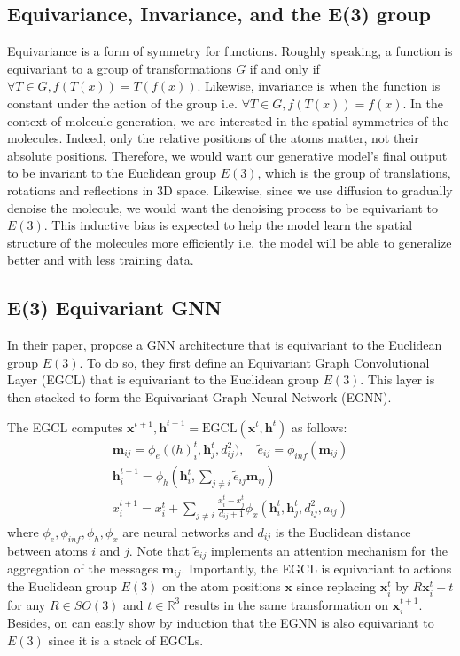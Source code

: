 \documentclass[sigconf]{acmart}
\begin{document}
\subsection{Equivariance, Invariance, and the E(3) group}
Equivariance is a form of symmetry for functions. Roughly speaking, a function is equivariant to a group of transformations $G$ 
if and only if $\forall T\in G, f(T(x)) = T(f(x))$.
Likewise, invariance is when the function is constant under the action of the group i.e. $\forall T\in G, f(T(x)) = f(x)$.
In the context of molecule generation, we are interested in the spatial symmetries of the molecules. Indeed, only the relative positions of the atoms matter, not their absolute positions.
Therefore, we would want our generative model's final output to be invariant to the Euclidean group $E(3)$, which is the group of translations, rotations and reflections in 3D space.
Likewise, since we use diffusion to gradually denoise the molecule, we would want the denoising process to be equivariant to $E(3)$.
This inductive bias is expected to help the model learn the spatial structure of the molecules more efficiently i.e. the model will be able to generalize better and with less training data.

\subsection{E(3) Equivariant GNN}
In their paper, \cite{edm} propose a GNN architecture that is equivariant to the Euclidean group $E(3)$. To do so, they first define an Equivariant 
Graph Convolutional Layer (EGCL) that is equivariant to the Euclidean group $E(3)$. This layer is then stacked to form the Equivariant Graph Neural Network (EGNN).

The EGCL computes $\mathbf{x}^{t+1}, \mathbf{h}^{t+1} = \text{EGCL}(\mathbf{x}^t, \mathbf{h}^t)$ as follows:
\begin{gather}
    \mathbf{m}_{ij} = \phi_e(\mathbf(h)_i^t, \mathbf{h}_j^t, d_{ij}^2), \quad \tilde{e}_{ij} = \phi_{inf}(\mathbf{m}_{ij}) \\
    \mathbf{h}_i^{t+1} = \phi_h(\mathbf{h}_i^t, \sum_{j\neq i} \tilde{e}_{ij} \mathbf{m}_{ij}) \\
    x_i^{t+1} = x_i^t + \sum_{j\neq i} \frac{x_i^t - x_j^t}{d_{ij}+1} \phi_x(\mathbf{h}_i^t, \mathbf{h}_j^t, d_{ij}^2, a_{ij})
\end{gather}
where $\phi_e, \phi_{inf}, \phi_h, \phi_x$ are neural networks and $d_{ij}$ is the Euclidean distance between atoms $i$ and $j$.
Note that $\tilde{e}_{ij}$ implements an attention mechanism for the aggregation of the messages $\mathbf{m}_{ij}$.
Importantly, the EGCL is equivariant to actions the Euclidean group $E(3)$ on the atom positions $\mathbf{x}$ since replacing $\mathbf{x}_i^t$ by $R\mathbf{x}_i^t + t$ for any $R\in SO(3)$ and $t\in \mathbb{R}^3$ results in the same transformation on $\mathbf{x}_i^{t+1}$.
Besides, on can easily show by induction that the EGNN is also equivariant to $E(3)$ since it is a stack of EGCLs.
\end{document}
